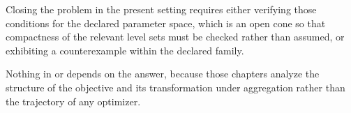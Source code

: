 Closing the problem in the present setting requires either verifying those
conditions for the declared parameter space, which is an open cone so that
compactness of the relevant level sets must be checked rather than assumed, or
exhibiting a counterexample within the declared family. 

Nothing in  or  depends on the
answer, because those chapters analyze the structure of the objective and its
transformation under aggregation rather than the trajectory of any optimizer.

